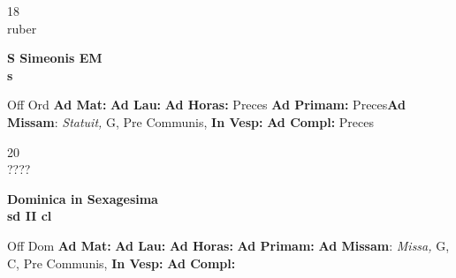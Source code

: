 \documentclass[10pt, openany]{book}
\begin{document}
    \begin{center}
        \begin{minipage}{3.5in}
            \vspace{2em}
            \begin{minipage}{0.5in}
                {\Huge 18} \\
                {\normalsize ruber}
            \end{minipage}
            \begin{minipage}{3.0in}
                \textbf{ \large S Simeonis EM \\
                \textnormal{\normalsize s}}

            \end{minipage}
            \begin{justify}Off Ord
                \textbf{Ad Mat: }
                \textbf{Ad Lau: }
                \textbf{Ad Horas: }Preces
                \textbf{Ad Primam: }Preces\textbf{Ad Missam}: \textit{Statuit,} G, Pre Communis, 
                \textbf{In Vesp: }
                \textbf{Ad Compl: }Preces
            \end{justify}
        \end{minipage}
    \end{center}

    \begin{center}
        \begin{minipage}{3.5in}
            \vspace{2em}
            \begin{minipage}{0.5in}
                {\Huge 20} \\
                {\normalsize ????}
            \end{minipage}
            \begin{minipage}{3.0in}
                \textbf{ \large Dominica in Sexagesima \\
                \textnormal{\normalsize sd II cl}}

            \end{minipage}
            \begin{justify}Off Dom
                \textbf{Ad Mat: }
                \textbf{Ad Lau: }
                \textbf{Ad Horas: }
                \textbf{Ad Primam: }\textbf{Ad Missam}: \textit{Missa,} G, C, Pre Communis, 
                \textbf{In Vesp: }
                \textbf{Ad Compl: }
            \end{justify}
        \end{minipage}
    \end{center}
\end{document}
